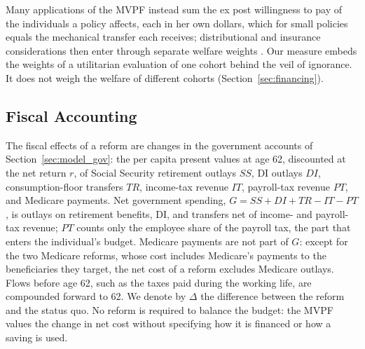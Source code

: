 Many applications of the MVPF instead sum the ex post willingness to pay of the individuals a policy affects, each in her own dollars, which for small policies equals the mechanical transfer each receives; distributional and insurance considerations then enter through separate welfare weights \citep{hendren2020unified,Finkelstein2020welfare,saez2016generalized}. Our measure embeds the weights of a utilitarian evaluation of one cohort behind the veil of ignorance. It does not weigh the welfare of different cohorts (Section~\ref{sec:financing}).

\subsection{Fiscal Accounting}\label{sec:fw_fiscal}

The fiscal effects of a reform are changes in the government accounts of Section~\ref{sec:model_gov}: the per capita present values at age 62, discounted at the net return $r$, of Social Security retirement outlays $\mathit{SS}$, DI outlays $\mathit{DI}$, consumption-floor transfers $\mathit{TR}$, income-tax revenue $\mathit{IT}$, payroll-tax revenue $\mathit{PT}$, and Medicare payments. Net government spending, $G=\mathit{SS}+\mathit{DI}+\mathit{TR}-\mathit{IT}-\mathit{PT}$, is outlays on retirement benefits, DI, and transfers net of income- and payroll-tax revenue; $\mathit{PT}$ counts only the employee share of the payroll tax, the part that enters the individual's budget. Medicare payments are not part of $G$: except for the two Medicare reforms, whose cost includes Medicare's payments to the beneficiaries they target, the net cost of a reform excludes Medicare outlays. Flows before age 62, such as the taxes paid during the working life, are compounded forward to 62. We denote by $\Delta$ the difference between the reform and the status quo. No reform is required to balance the budget: the MVPF values the change in net cost without specifying how it is financed or how a saving is used.

